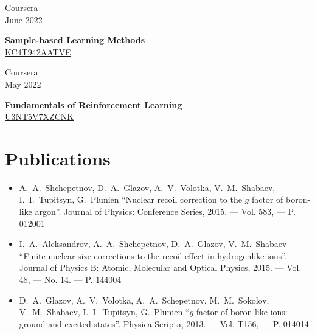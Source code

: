 \documentclass[10pt,a4paper]{article}
\newcommand{\lmpratio}{0.15}
\newcommand{\rmpratio}{0.74}
\newcommand{\verticalSpace}{0.3cm}
\newcommand{\horizontalSpace}{0.05\textwidth}
\newcommand{\sectionMain}[1]{\textbf{#1}}
\begin{document}
	\begin{minipage}[t]{\lmpratio\textwidth}
		Coursera\\June 2022
	\end{minipage}
	\hspace{\horizontalSpace}
	\begin{minipage}[t]{\rmpratio\textwidth}
		\sectionMain{Sample-based Learning Methods}\\
		\href{https://www.coursera.org/account/accomplishments/certificate/KC4T942AATVE}{KC4T942AATVE}
	\end{minipage}
	\vspace{1cm}

		
	\begin{minipage}[t]{\lmpratio\textwidth}
		Coursera\\May 2022
	\end{minipage}
	\hspace{\horizontalSpace}
	\begin{minipage}[t]{\rmpratio\textwidth}
		\sectionMain{Fundamentals of Reinforcement Learning}\\
		\href{https://www.coursera.org/account/accomplishments/certificate/U3NT5V7XZCNK}{U3NT5V7XZCNK}
	\end{minipage}
	\vspace{1cm}
		
	
	\section*{Publications}
	\begin{itemize}
		\item A.~A.~Shchepetnov, D.~A.~Glazov, A.~V.~Volotka, V.~M.~Shabaev, I.~I.~Tupitsyn, G.~Plunien 
			``Nuclear recoil correction to the $g$ factor of boron-like argon''. Journal of Physics: Conference Series, 2015. --- Vol. 583, --- P. 012001
		\item I.~A.~Aleksandrov, A.~A.~Shchepetnov, D.~A.~Glazov, V.~M.~Shabaev 
			``Finite nuclear size corrections to the recoil effect in hydrogenlike ions''. Journal of Physics B: Atomic, Molecular and Optical Physics, 2015. --- Vol. 48, --- No. 14. --- P. 144004		
		\item D.~A.~Glazov, A.~V.~Volotka, A.~A.~Schepetnov, M.~M.~Sokolov, V.~M.~Shabaev, I.~I.~Tupitsyn, G.~Plunien 
			``$g$ factor of boron-like ions: ground and excited states''. Physica Scripta, 2013. --- Vol. T156, --- P. 014014
	\end{itemize}
\end{document}
